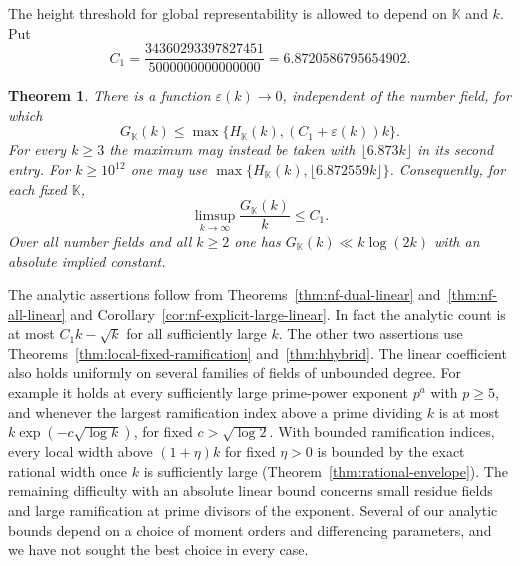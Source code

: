 \documentclass[11pt,letterpaper]{article}
\newtheorem{theorem}{Theorem}[section]
\theoremstyle{definition}
\numberwithin{equation}{section}
\begin{document}
The height threshold for global
representability is allowed to depend on $\mathbb K$ and $k$.
Put
\[
          C_1=\frac{34360293397827451}{5000000000000000}
             =6.8720586795654902 .
\]
\begin{theorem}\label{thm:intro-main}
There is a function $\varepsilon(k)\to0$, independent of the number field,
for which
\[
       G_{\mathbb K}(k)\le
          \max\{H_{\mathbb K}(k),(C_1+\varepsilon(k))k\}.
\]
For every $k\ge3$ the maximum may instead be taken with $\lfloor6.873k\rfloor$ in its second entry. For $k\ge10^{12}$ one may use
$\max\{H_{\mathbb K}(k),\lfloor6.872559k\rfloor\}$.
Consequently, for each fixed $\mathbb K$,
\[
       \limsup_{k\to\infty}\frac{G_{\mathbb K}(k)}k\le C_1 .
\]
Over all number fields and all $k\ge2$ one has
$G_{\mathbb K}(k)\ll k\log(2k)$ with an absolute implied constant.
\end{theorem}

The analytic assertions follow from Theorems~\ref{thm:nf-dual-linear} and~\ref{thm:nf-all-linear} and Corollary~\ref{cor:nf-explicit-large-linear}. In fact the analytic count is at most $C_1 k-\sqrt{k}$ for all sufficiently large $k$.
The other two assertions use Theorems~\ref{thm:local-fixed-ramification}
and~\ref{thm:hhybrid}. The linear coefficient also holds uniformly on
several families of fields of unbounded degree. For example it holds
at every sufficiently large prime-power exponent $p^a$ with $p\ge5$,
and whenever the largest ramification index above a prime dividing
$k$ is at most $k\exp(-c\sqrt{\log k})$, for fixed
$c>\sqrt{\log2}$. With bounded ramification indices, every local width above $(1+\eta)k$ for fixed $\eta>0$ is bounded by the exact rational width once $k$ is sufficiently large (Theorem~\ref{thm:rational-envelope}). The remaining difficulty with an absolute linear
bound concerns small residue fields and large ramification at prime
divisors of the exponent. Several of our analytic bounds depend on a
choice of moment orders and differencing parameters, and we have not
sought the best choice in every case.
\end{document}
